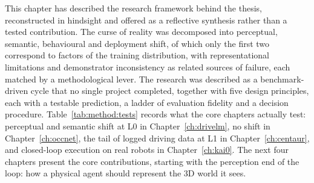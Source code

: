 This chapter has described the research framework behind the thesis, reconstructed in hindsight and offered as a reflective synthesis rather than a tested contribution. The curse of reality was decomposed into perceptual, semantic, behavioural and deployment shift, of which only the first two correspond to factors of the training distribution, with representational limitations and demonstrator inconsistency as related sources of failure, each matched by a methodological lever. The research was described as a benchmark-driven cycle that no single project completed, together with five design principles, each with a testable prediction, a ladder of evaluation fidelity and a decision procedure. Table~\ref{tab:method:tests} records what the core chapters actually test: perceptual and semantic shift at L0 in Chapter~\ref{ch:drivelm}, no shift in Chapter~\ref{ch:occnet}, the tail of logged driving data at L1 in Chapter~\ref{ch:centaur}, and closed-loop execution on real robots in Chapter~\ref{ch:kai0}. The next four chapters present the core contributions, starting with the perception end of the loop: how a physical agent should represent the 3D world it sees.
